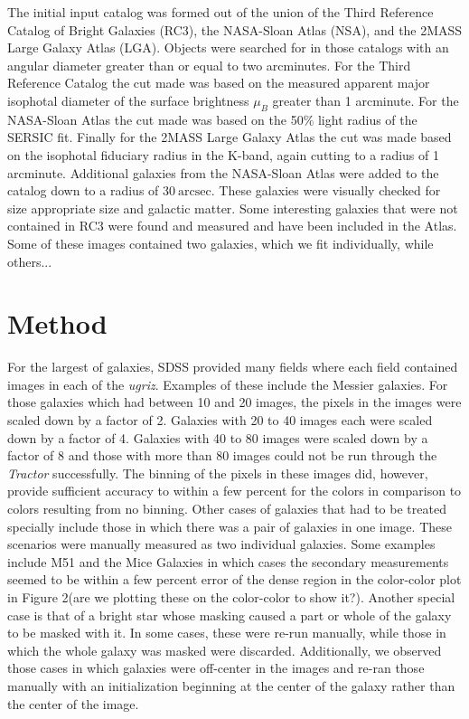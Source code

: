 \documentclass[12pt,preprint,pdftex]{aastex}
\newcommand{\units}[1]{\mathrm{#1}}
\renewcommand{\arcsec}{\units{arcsec}}
\begin{document}
The initial input catalog was formed out of the union of the Third Reference Catalog of Bright Galaxies (RC3), the NASA-Sloan Atlas (NSA), and the 2MASS Large Galaxy Atlas (LGA). Objects were searched for in those catalogs with an angular diameter greater than or equal to two arcminutes. For the Third Reference Catalog the cut made was based on the measured apparent major isophotal diameter of the surface brightness $\mu_{B}$ greater than 1 arcminute. For the NASA-Sloan Atlas the cut made was based on the 50\% light radius of the SERSIC fit. Finally for the 2MASS Large Galaxy Atlas the cut was made based on the isophotal fiduciary radius in the K-band, again cutting to a radius of 1 arcminute. Additional galaxies from the NASA-Sloan Atlas were added to the catalog down to a radius of $30~\arcsec$. These galaxies were visually checked for size appropriate size and galactic matter. Some interesting galaxies that were not contained in RC3 were found and measured and have been included in the Atlas. Some of these images contained two galaxies, which we fit individually, while others...

\section{Method}


For the largest of galaxies, SDSS provided many fields where each field contained images in each of the \textit{ugriz}. Examples of these include the Messier galaxies. For those galaxies which had between 10 and 20 images, the pixels in the images were scaled down by a factor of 2. Galaxies with 20 to 40 images each were scaled down by a factor of 4. Galaxies with 40 to 80 images were scaled down by a factor of 8 and those with more than 80 images could not be run through the \textit{Tractor} successfully. The binning of the pixels in these images did, however, provide sufficient accuracy to within a few percent for the colors in comparison to colors resulting from no binning. Other cases of galaxies that had to be treated specially include those in which there was a pair of galaxies in one image. These scenarios were manually measured as two individual galaxies. Some examples include M51 and the Mice Galaxies in which cases the secondary measurements seemed to be within a few percent error of the dense region in the color-color plot in Figure 2(are we plotting these on the color-color to show it?). Another special case is that of a bright star whose masking caused a part or whole of the galaxy to be masked with it. In some cases, these were re-run manually, while those in which the whole galaxy was masked were discarded.  Additionally, we observed those cases in which galaxies were off-center in the images and re-ran those manually with an initialization beginning at the center of the galaxy rather than the center of the image. 
\end{document}
